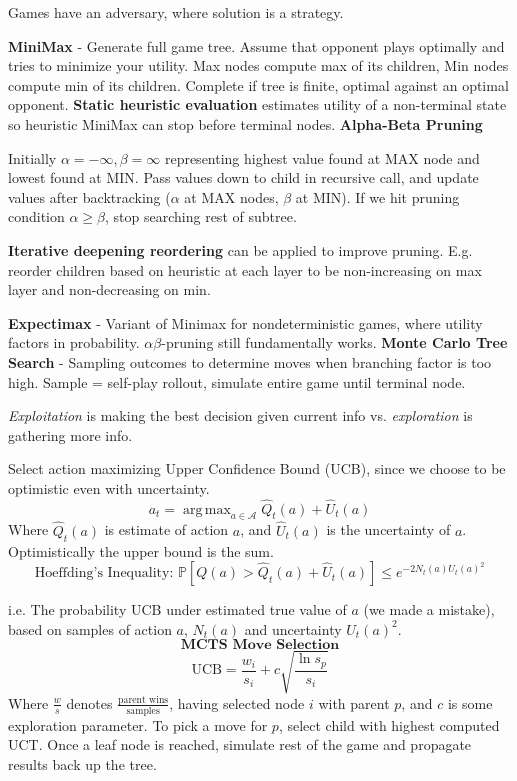 \documentclass[a4paper,10pt,twocolumn]{article}
\DeclareMathOperator*{\argmax}{arg\,max}
\begin{document}
\begin{tcolorbox}[title=Game Search, module]
    Games have an adversary, where solution is a strategy.

    \textbf{MiniMax} - Generate full game tree. Assume that opponent plays optimally and tries to minimize your utility. Max nodes compute max of its children, Min nodes compute min of its children. Complete if tree is finite, optimal against an optimal opponent.
    \textbf{Static heuristic evaluation} estimates utility of a non-terminal state so heuristic MiniMax can stop before terminal nodes.
    \textbf{Alpha-Beta Pruning}

    Initially $\alpha = -\infty, \beta = \infty$ representing highest value found at MAX node and lowest found at MIN. Pass values down to child in recursive call, and update values after backtracking ($\alpha$ at MAX nodes, $\beta$ at MIN). If we hit pruning condition $\alpha \ge \beta$, stop searching rest of subtree.

    \textbf{Iterative deepening reordering} can be applied to improve pruning. E.g. reorder children based on heuristic at each layer to be non-increasing on max layer and non-decreasing on min.

    \textbf{Expectimax} - Variant of Minimax for nondeterministic games, where utility factors in probability. $\alpha \beta$-pruning still fundamentally works.
    \textbf{Monte Carlo Tree Search} - Sampling outcomes to determine moves when branching factor is too high. Sample = self-play rollout, simulate entire game until terminal node.

    \textit{Exploitation} is making the best decision given current info vs. \textit{exploration} is gathering more info.

    Select action maximizing Upper Confidence Bound (UCB), since we choose to be optimistic even with uncertainty.
    \[
        a_t = \argmax_{a \in \mathcal{A}}  \hat{Q}_t(a) + \hat{U}_t(a)
    \]
    Where $\hat{Q}_t(a)$ is estimate of action $a$, and $\hat{U}_t(a)$ is the uncertainty of $a$. Optimistically the upper bound is the sum.
    \[
        \text{Hoeffding's Inequality: } \mathbb{P}[Q(a) > \hat{Q}_t(a) + \hat{U}_t(a)] \le e^{-2N_t(a)U_t(a)^2}
    \]

    i.e. The probability UCB under estimated true value of $a$ (we made a mistake), based on samples of action $a$, $N_t(a)$ and uncertainty $U_t(a)^2$.
    \[\textbf{MCTS Move Selection}\]
    \[
        \text{UCB} = \frac{w_i}{s_i} + c \sqrt{\frac{\ln{s_p}}{s_i}}
    \]
    Where $\frac{w}{s}$ denotes $\frac{\text{parent wins}}{\text{samples}}$, having selected node $i$ with parent $p$, and $c$ is some exploration parameter. To pick a move for $p$, select child with highest computed UCT. Once a leaf node is reached, simulate rest of the game and propagate results back up the tree.

\end{tcolorbox}
\end{document}
